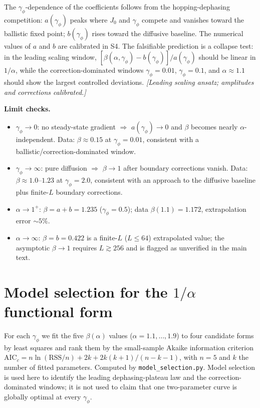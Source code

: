 \documentclass[aps,prb,twocolumn,superscriptaddress]{revtex4-2}
\begin{document}
The $\gamma_\phi$-dependence of the coefficients follows from the hopping-dephasing competition: $a(\gamma_\phi)$ peaks where $J_0$ and $\gamma_\phi$ compete and vanishes toward the ballistic fixed point; $b(\gamma_\phi)$ rises toward the diffusive baseline. The numerical values of $a$ and $b$ are calibrated in S4. The falsifiable prediction is a collapse test: in the leading scaling window, $[\beta(\alpha,\gamma_\phi) - b(\gamma_\phi)]/a(\gamma_\phi)$ should be linear in $1/\alpha$, while the correction-dominated windows $\gamma_\phi = 0.01$, $\gamma_\phi = 0.1$, and $\alpha \approx 1.1$ should show the largest controlled deviations. \textit{[Leading scaling ansatz; amplitudes and corrections calibrated.]}

\textbf{Limit checks.}
\begin{itemize}
\item $\gamma_\phi \to 0$: no steady-state gradient $\Rightarrow$ $a(\gamma_\phi) \to 0$ and $\beta$ becomes nearly $\alpha$-independent. Data: $\beta \approx 0.15$ at $\gamma_\phi = 0.01$, consistent with a ballistic/correction-dominated window.
\item $\gamma_\phi \to \infty$: pure diffusion $\Rightarrow$ $\beta \to 1$ after boundary corrections vanish. Data: $\beta \approx 1.0$--$1.23$ at $\gamma_\phi = 2.0$, consistent with an approach to the diffusive baseline plus finite-$L$ boundary corrections.
\item $\alpha \to 1^+$: $\beta = a + b = 1.235$ ($\gamma_\phi = 0.5$); data $\beta(1.1) = 1.172$, extrapolation error $\sim 5\%$.
\item $\alpha \to \infty$: $\beta = b = 0.422$ is a finite-$L$ ($L \leq 64$) extrapolated value; the asymptotic $\beta \to 1$ requires $L \gtrsim 256$ and is flagged as unverified in the main text.
\end{itemize}

\section{Model selection for the $1/\alpha$ functional form}
\label{sec:S4}

For each $\gamma_\phi$ we fit the five $\beta(\alpha)$ values ($\alpha = 1.1, \dots, 1.9$) to four candidate forms by least squares and rank them by the small-sample Akaike information criterion $\text{AIC}_c = n\ln(\text{RSS}/n) + 2k + 2k(k+1)/(n-k-1)$, with $n = 5$ and $k$ the number of fitted parameters. Computed by \texttt{model\_selection.py}. Model selection is used here to identify the leading dephasing-plateau law and the correction-dominated windows; it is not used to claim that one two-parameter curve is globally optimal at every $\gamma_\phi$.
\end{document}
